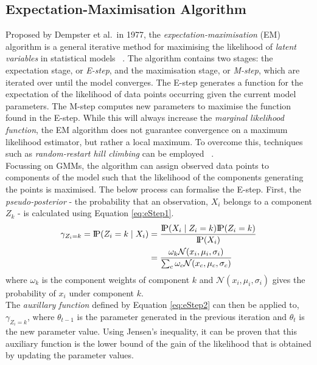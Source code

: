 \subsection{Expectation-Maximisation Algorithm}
\label{sec:EMAlg}
\indent \indent
Proposed by Dempster et al.\ in 1977, the \textit{expectation-maximisation} (EM) algorithm is a general iterative method for maximising the likelihood of \textit{latent variables} in statistical models ~\cite{Dempster}. The algorithm contains two stages: the expectation stage, or \textit{E-step}, and the maximisation stage, or \textit{M-step}, which are iterated over until the model converges. The E-step generates a function for the expectation of the likelihood of data points occurring given the current model parameters. The M-step computes new parameters to maximise the function found in the E-step. While this will always increase the \textit{marginal likelihood function}, the EM algorithm does not guarantee convergence on a maximum likelihood estimator, but rather a local maximum. To overcome this, techniques such as \textit{random-restart hill climbing} can be employed ~\cite{HillClimbing}.
\smallskip \\ \indent
Focussing on GMMs, the algorithm can assign observed data points to components of the model such that the likelihood of the components generating the points is maximised. The below process can formalise the E-step. First, the \textit{pseudo-posterior} - the probability that an observation, $X_i$ belongs to a component $Z_k$  - is calculated using Equation \ref{eq:eStep1}.
\begin{align}
    \label{eq:eStep1}
    \gamma_{Z_i = k} = \text{I\kern-0.15em P} (Z_i = k \; | \; X_i) &= \frac{\text{I\kern-0.15em P} (X_i \; | \; Z_i = k) \text{I\kern-0.15em P}(Z_i=k)}{\text{I\kern-0.15em P}(X_i)} \\
                     &= \frac{\omega_k \mathcal{N}(x_i, \mu_i, \sigma_i)}{\sum_c \omega_c \mathcal{N} (x_c, \mu_c, \sigma_c)} 
\end{align}
where $\omega_k$ is the component weights of component $k$ and $\mathcal{N}(x_i, \mu_i, \sigma_i)$ gives the probability of $x_i$ under component $k$.
\smallskip \\ \indent
The \textit{auxillary function} defined by Equation \ref{eq:eStep2} can then be applied to, $\gamma_{Z_i = k}$, where $\theta_{t-1}$ is the parameter generated in the previous iteration and $\theta_t$ is the new parameter value. Using Jensen's inequality, it can be proven that this auxiliary function is the lower bound of the gain of the likelihood that is obtained by updating the parameter values.
